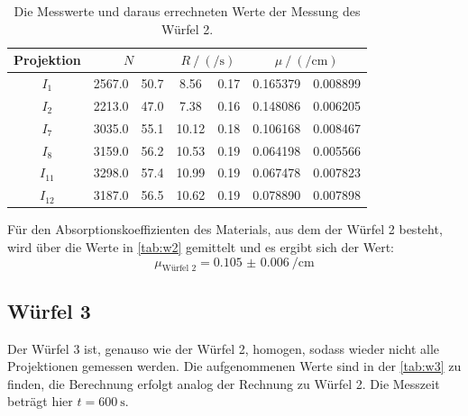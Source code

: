   \begin{table}[H]
    \centering
    \caption{Die Messwerte und daraus errechneten Werte der Messung des Würfel 2.}
    \label{tab:w2}
    \begin{tabular}{c S[table-format=4.1] @{${}\pm{}$} S[table-format=2.1] S[table-format=3.2] @{${}\pm{}$} S[table-format=1.2] S[table-format=1.6] @{${}\pm{}$} S[table-format=1.6]}
      \toprule
      {Projektion} &  &  &  \\
      \midrule
      $I_1$ & 2567.0 & 50.7 &  8.56 & 0.17 & 0.165379 & 0.008899 \\
      $I_2$ & 2213.0 & 47.0 &  7.38 & 0.16 & 0.148086 & 0.006205 \\
      $I_7$ & 3035.0 & 55.1 & 10.12 & 0.18 & 0.106168 & 0.008467 \\
      $I_8$ & 3159.0 & 56.2 & 10.53 & 0.19 & 0.064198 & 0.005566 \\
      $I_{11}$& 3298.0 & 57.4 & 10.99 & 0.19 & 0.067478 & 0.007823 \\
      $I_{12}$& 3187.0 & 56.5 & 10.62 & 0.19 & 0.078890 & 0.007898 \\
      \bottomrule  
    \end{tabular}
  \end{table}

  \noindent Für den Absorptionskoeffizienten des Materials, aus dem der Würfel 2 besteht, wird über die Werte in \autoref{tab:w2} gemittelt und es 
  ergibt sich der Wert:
  \begin{equation*}
    \mu_{\text{Würfel 2}} = \SI{0.105(6)}{\per\centi\metre} 
  \end{equation*}

\subsection{Würfel 3}

  \noindent Der Würfel 3 ist, genauso wie der Würfel 2, homogen, sodass wieder nicht alle Projektionen gemessen werden. Die aufgenommenen Werte sind 
  in der \autoref{tab:w3} zu finden, die Berechnung erfolgt analog der Rechnung zu Würfel 2. Die Messzeit beträgt hier $t= \SI{600}{\second}$. 

